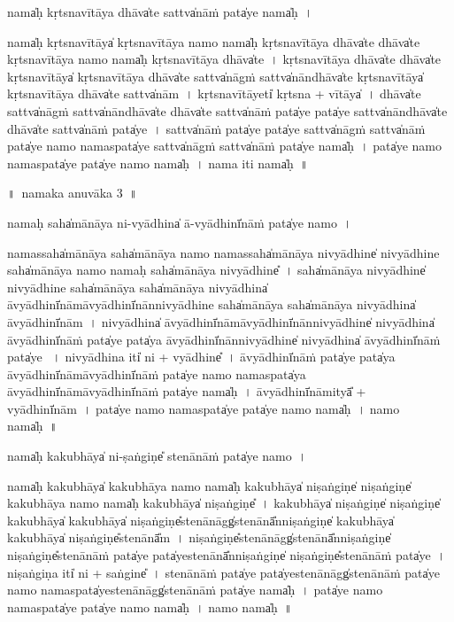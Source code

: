 \documentclass[parskip, DIV=14]{scrartcl}
\begin{document}
{\vspace{0.5cm}
nama̍ḥ kṛtsnavī॒tāya॒ dhāva̍te॒ sattva̍nā॒ṁ  pata̍ye॒ nama̍ḥ~।

nama̍ḥ kṛtsnavī॒tāya̍ kṛtsnavī॒tāya॒ namo॒ nama̍ḥ kṛtsnavī॒tāya॒ dhāva̍te॒ dhāva̍te kṛtsnavī॒tāya॒ namo॒ nama̍ḥ kṛtsnavī॒tāya॒ dhāva̍te~।
kṛ॒tsna॒vī॒tāya॒ dhāva̍te॒ dhāva̍te kṛtsnavī॒tāya̍ kṛtsnavī॒tāya॒ dhāva̍te॒ sattva̍nā॒gṁ॒ sattva̍nā॒ndhāva̍te kṛtsnavī॒tāya̍ kṛtsnavī॒tāya॒ dhāva̍te॒ sattva̍nām~।
kṛ॒tsna॒vī॒tāyeti̍ kṛtsna + vī॒tāya̍~।
dhāva̍te॒ sattva̍nā॒gṁ॒ sattva̍nā॒ndhāva̍te॒ dhāva̍te॒ sattva̍nā॒ṁ pata̍ye॒ pata̍ye॒ sattva̍nā॒ndhāva̍te॒ dhāva̍te॒ sattva̍nā॒ṁ pata̍ye~।
sattva̍nā॒ṁ pata̍ye॒ pata̍ye॒ sattva̍nā॒gṁ॒ sattva̍nā॒ṁ pata̍ye॒ namo॒ nama॒spata̍ye॒ sattva̍nā॒gṁ॒ sattva̍nā॒ṁ pata̍ye॒ nama̍ḥ~।
pata̍ye॒ namo॒ nama॒spata̍ye॒ pata̍ye॒ namo॒ nama̍ḥ~।
nama॒ iti॒ nama̍ḥ~॥ 

\newpage
\LARGE
॥~namaka anuvāka 3~॥ 
\Large

nama॒ḥ saha̍mānāya ni-vyā॒dhina̍ ā-vyā॒dhinī̍nā॒ṁ pata̍ye॒ namo॒~।

nama॒ssaha̍mānāya॒ saha̍mānāya॒ namo॒ nama॒ssaha̍mānāya nivyā॒dhine̍ nivyā॒dhine॒ saha̍mānāya॒ namo॒ nama॒ḥ saha̍mānāya nivyā॒dhine̎~।
saha̍mānāya nivyā॒dhine̍ nivyā॒dhine॒ saha̍mānāya॒ saha̍mānāya nivyā॒dhina̍ āvyā॒dhinī̍nāmāvyā॒dhinī̍nānnivyā॒dhine॒ saha̍mānāya॒ saha̍mānāya nivyā॒dhina̍ āvyā॒dhinī̍nām~।
ni॒vyā॒dhina̍ āvyā॒dhinī̍nāmāvyā॒dhinī̍nānnivyā॒dhine̍ nivyā॒dhina̍ āvyā॒dhinī̍nā॒ṁ pata̍ye॒ pata̍ya āvyā॒dhinī̍nānnivyā॒dhine̍ nivyā॒dhina̍ āvyā॒dhinī̍nā॒ṁ pata̍ye ~।
ni॒vyā॒dhina॒ iti̍ ni + vyā॒dhine̎~।
ā॒vyā॒dhinī̍nā॒ṁ pata̍ye॒ pata̍ya āvyā॒dhinī̍nāmāvyā॒dhinī̍nā॒ṁ pata̍ye॒ namo॒ nama॒spata̍ya āvyā॒dhinī̍nāmāvyā॒dhinī̍nā॒ṁ pata̍ye॒ nama̍ḥ~।
ā॒vyā॒dhinī̍nā॒mityā̎ + vyā॒dhinī̍nām~।
pata̍ye॒ namo॒ nama॒spata̍ye॒ pata̍ye॒ namo॒ nama̍ḥ~।
namo॒ nama̍ḥ~॥ 

nama̍ḥ kaku॒bhāya̍  ni-ṣa॒ṅgiṇe̎ ste॒nānā॒ṁ pata̍ye॒ namo॒~।

nama̍ḥ kaku॒bhāya̍ kaku॒bhāya॒ namo॒ nama̍ḥ kaku॒bhāya̍ niṣa॒ṅgiṇe̍ niṣa॒ṅgiṇe̍ kaku॒bhāya॒ namo॒ nama̍ḥ kaku॒bhāya̍ niṣa॒ṅgiṇe̎~।
ka॒ku॒bhāya̍ niṣa॒ṅgiṇe̍ niṣa॒ṅgiṇe̍ kaku॒bhāya̍ kaku॒bhāya̍ niṣa॒ṅgiṇe̎ste॒nānāgg̍ste॒nānā̎nniṣa॒ṅgiṇe̍ kaku॒bhāya̍ kaku॒bhāya̍ niṣa॒ṅgiṇe̎ste॒nānā̎m~।
ni॒ṣa॒ṅgiṇe̎ste॒nānāgg̍ste॒nānā̎nniṣa॒ṅgiṇe̍ niṣa॒ṅgiṇe̎ste॒nānā॒ṁ pata̍ye॒ pata̍yeste॒nānā̎nniṣa॒ṅgiṇe̍ niṣa॒ṅgiṇe̎ste॒nānā॒ṁ pata̍ye~।
ni॒ṣa॒ṅgiṇa॒ iti̍ ni + sa॒ṅgine̎~।
ste॒nānā॒ṁ pata̍ye॒ pata̍yeste॒nānāgg̍ste॒nānā॒ṁ pata̍ye॒ namo॒ nama॒spata̍yeste॒nānāgg̍ste॒nānā॒ṁ pata̍ye॒ nama̍ḥ~।
pata̍ye॒ namo॒ nama॒spata̍ye॒ pata̍ye॒ namo॒ nama̍ḥ~।
namo॒ nama̍ḥ~॥ 

}
\end{document}

